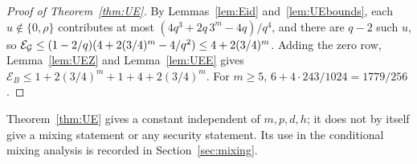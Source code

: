 \begin{proof}[Proof of Theorem~\ref{thm:UE}]
By Lemmas~\ref{lem:Eid} and~\ref{lem:UEbounds}, each $u\notin\{0,\rho\}$ contributes at most
$(4q^3+2q\,3^m-4q)/q^4$, and there are $q-2$ such $u$, so
$\mathcal E_{\mathcal{G}}\le(1-2/q)(4+2(3/4)^m-4/q^2)\le4+2(3/4)^m$. Adding the zero row, Lemma~\ref{lem:UEZ}
and Lemma~\ref{lem:UEE} gives $\mathcal E_B\le 1+2(3/4)^m+1+4+2(3/4)^m$. For $m\ge5$,
$6+4\cdot243/1024=1779/256$.
\end{proof}

\begin{remark}
Theorem~\ref{thm:UE} gives a constant independent of $m,p,d,h$; it does not by itself give a mixing
statement or any security statement. Its use in the conditional mixing analysis is recorded in
Section~\ref{sec:mixing}.
\end{remark}
